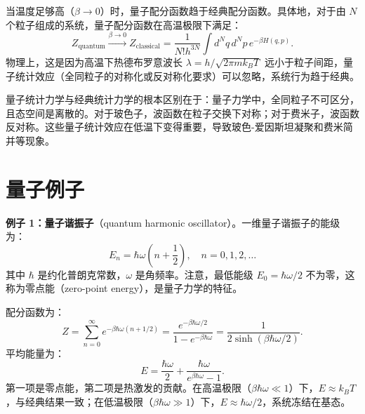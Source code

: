 \begin{property}[量子配分函数的经典极限]
当温度足够高（$\beta \to 0$）时，量子配分函数趋于经典配分函数。具体地，对于由 $N$ 个粒子组成的系统，量子配分函数在高温极限下满足：
\begin{equation}
    Z_{\text{quantum}} \xrightarrow{\beta \to 0} Z_{\text{classical}} = \frac{1}{N! h^{3N}} \int d^Nq \, d^Np \, e^{-\beta H(q,p)}.
\end{equation}
物理上，这是因为高温下热德布罗意波长 $\lambda = h/\sqrt{2\pi m k_B T}$ 远小于粒子间距，量子统计效应（全同粒子的对称化或反对称化要求）可以忽略，系统行为趋于经典\cite{Landau1937}。
\end{property}

\begin{remark}[量子统计与经典统计的区别]
量子统计力学与经典统计力学的根本区别在于：量子力学中，全同粒子不可区分，且态空间是离散的。对于玻色子，波函数在粒子交换下对称；对于费米子，波函数反对称。这些量子统计效应在低温下变得重要，导致玻色-爱因斯坦凝聚和费米简并等现象。
\end{remark}

\section{量子例子}

\begin{example}[量子谐振子]
\textbf{例子 1：量子谐振子}（quantum harmonic oscillator）。一维量子谐振子的能级为：
\begin{equation}
    E_n = \hbar \omega \left(n + \frac{1}{2}\right), \quad n = 0, 1, 2, \ldots
\end{equation}
其中 $\hbar$ 是约化普朗克常数，$\omega$ 是角频率。注意，最低能级 $E_0 = \hbar\omega/2$ 不为零，这称为零点能（zero-point energy），是量子力学的特征。

配分函数为：
\begin{equation}
    Z = \sum_{n=0}^{\infty} e^{-\beta \hbar \omega (n + 1/2)} = \frac{e^{-\beta \hbar \omega/2}}{1 - e^{-\beta \hbar \omega}} = \frac{1}{2 \sinh(\beta \hbar \omega/2)}.
\end{equation}
平均能量为：
\begin{equation}
    E = \frac{\hbar \omega}{2} + \frac{\hbar \omega}{e^{\beta \hbar \omega} - 1}.
\end{equation}
第一项是零点能，第二项是热激发的贡献。在高温极限（$\beta \hbar \omega \ll 1$）下，$E \approx k_B T$，与经典结果一致；在低温极限（$\beta \hbar \omega \gg 1$）下，$E \approx \hbar\omega/2$，系统冻结在基态。
\end{example}


